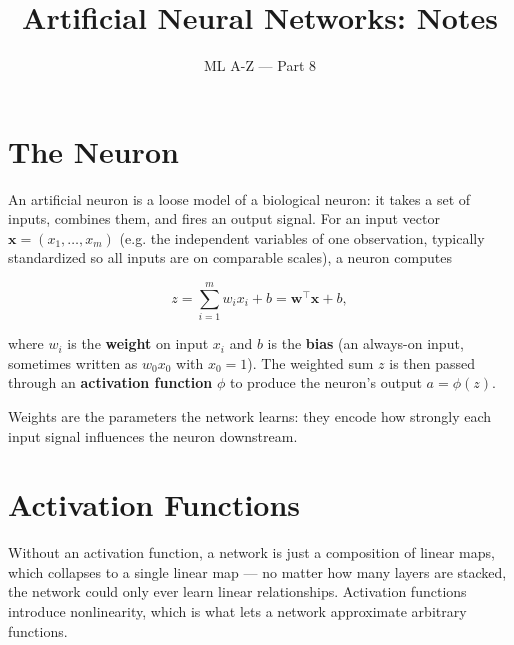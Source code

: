 \documentclass[11pt]{article}
\title{Artificial Neural Networks: Notes}
\author{ML A-Z --- Part 8}
\date{}
\begin{document}
\maketitle

\section{The Neuron}

An artificial neuron is a loose model of a biological neuron: it takes a
set of inputs, combines them, and fires an output signal. For an input
vector $\mathbf{x} = (x_1, \dots, x_m)$ (e.g. the independent variables of
one observation, typically standardized so all inputs are on comparable
scales), a neuron computes

\[
  z = \sum_{i=1}^{m} w_i x_i + b = \mathbf{w}^\top \mathbf{x} + b,
\]

where $w_i$ is the \textbf{weight} on input $x_i$ and $b$ is the
\textbf{bias} (an always-on input, sometimes written as $w_0 x_0$ with
$x_0 = 1$). The weighted sum $z$ is then passed through an
\textbf{activation function} $\phi$ to produce the neuron's output
$a = \phi(z)$.

Weights are the parameters the network learns: they encode how strongly
each input signal influences the neuron downstream.

\section{Activation Functions}

Without an activation function, a network is just a composition of linear
maps, which collapses to a single linear map --- no matter how many layers
are stacked, the network could only ever learn linear relationships.
Activation functions introduce nonlinearity, which is what lets a network
approximate arbitrary functions.
\end{document}
